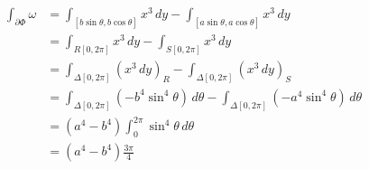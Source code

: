 \documentclass[11pt]{article}
\begin{document}
\begin{solution}
\begin{align*}
    \int_{\partial \Phi} \omega &= \int_{[b\sin\theta, b\cos \theta]}x^3\,dy - \int_{[a\sin\theta, a\cos\theta]}x^3\,dy\\
    &= \int_{R[0,2\pi]} x^3\,dy - \int_{S[0,2\pi]}x^3 \,dy\\
    &= \int_{\Delta[0,2\pi]} (x^3\,dy)_R - \int_{\Delta[0,2\pi]}(x^3\,dy)_S\\
    &= \int_{\Delta[0,2\pi]} (-b^4 \sin^4\theta)\,d\theta - \int_{\Delta[0,2\pi]}(-a^4\sin^4 \theta)\,d\theta\\
    &= (a^4 - b^4)\int_0^{2\pi}\sin^4\theta\,d\theta\\
    &= (a^4 - b^4)\frac{3\pi }{4}
\end{align*}

\end{solution}
\end{document}
